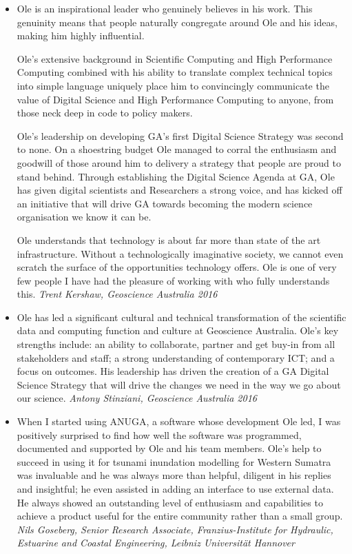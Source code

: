 \documentclass[11pt,a4paper]{article}
\begin{document}
\begin{itemize}
\item  Ole is an inspirational leader who genuinely believes in his work. This genuinity means that people naturally congregate around Ole and his ideas, making him highly influential.

Ole’s extensive background in Scientific Computing and High Performance Computing combined with his ability to translate complex technical topics into simple language uniquely place him to convincingly communicate the value of Digital Science and High Performance Computing to anyone, from those neck deep in code to policy makers.

Ole’s leadership on developing GA’s first Digital Science Strategy was second to none. On a shoestring budget Ole managed to corral the enthusiasm and goodwill of those around him to delivery a strategy that people are proud to stand behind. Through establishing the Digital Science Agenda at GA, Ole has given digital scientists and Researchers a strong voice, and has kicked off an initiative that will drive GA towards becoming the modern science organisation we know it can be.

Ole understands that technology is about far more than state of the art infrastructure. Without a technologically imaginative society, we cannot even scratch the surface of the opportunities technology offers. Ole is one of very few people I have had the pleasure of working with who fully understands this.
\emph{Trent Kershaw, Geoscience Australia 2016}

\item
  Ole has led a significant cultural and technical transformation of the scientific data and computing function and culture at Geoscience Australia.  Ole’s key strengths include: an ability to collaborate, partner and get buy-in from all stakeholders and staff; a strong understanding of contemporary ICT; and a focus on outcomes.  His leadership has driven the creation of a GA Digital Science Strategy that will drive the changes we need in the way we go about our science.
  \emph{Antony Stinziani, Geoscience Australia 2016}

\item
  When I started using ANUGA, a software whose development Ole led, I was positively surprised to find how well the software was programmed, documented and supported by Ole and his team members. Ole's help to succeed in using it for tsunami inundation modelling for Western Sumatra was invaluable and he was always more than helpful, diligent in his replies and insightful; he even assisted in adding an interface to use external data. He always showed an outstanding level of enthusiasm and capabilities to achieve a product useful for the entire community rather than a small group.
  \emph{Nils Goseberg, Senior Research Associate, Franzius-Institute for Hydraulic, Estuarine and Coastal Engineering, Leibniz Universität Hannover}


\end{itemize}
\end{document}
